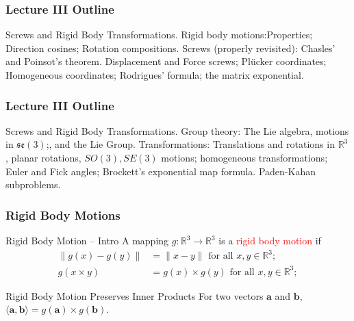 \begin{frame}
	\frametitle{Lecture III Outline}
	\begin{tcolorbox}[coltitle=yellow!50!black,colframe=magenta!25,split=.2,title=Rigid Body Motions]
		Screws and Rigid Body Transformations.
		\tcblower
		Rigid body motions:Properties; Direction cosines; Rotation compositions.
		\vspace{.2cm}
		\newline
		Screws (properly revisited): Chasles' and Poinsot's theorem.
		\vspace{.2cm}
		\newline
		Displacement and Force screws; Pl{\"u}cker coordinates; Homogeneous coordinates;
		\vspace{.2cm}
		\newline
		Rodrigues' formula; the matrix exponential.
	\end{tcolorbox}
\end{frame}

\begin{frame}
	\frametitle{Lecture III Outline}
	\begin{tcolorbox}[coltitle=yellow!50!black,colframe=magenta!25,split=.2,title=Rigid Body Motions]
		Screws and Rigid Body Transformations.
		\tcblower
		Group theory: The Lie algebra, motions in $\mathfrak{se}(3)$;, and the Lie Group.
		\vspace{.2cm}
		\newline
		Transformations: Translations and rotations in $\mathbb{R}^3$, planar rotations, $SO(3), SE(3)$ motions;  homogeneous transformations; Euler and Fick angles; Brockett's exponential map formula. Paden-Kahan subproblems.
	\end{tcolorbox}
\end{frame}

\begin{frame}
	\frametitle{Rigid Body Motions}
	\begin{block}{Rigid Body Motion -- Intro}
		A mapping $g:  \mathbb{R}^3  \rightarrow \mathbb{R}^3$ is a \textcolor{red}{rigid body motion} if 
		\begin{align}
			\|g({x}) - g({y})\| &= \|{x} - {y}\| \text{ for all }  {x}, {y} \in \mathbb{R}^3;  \\
			g({x} \times {y}) &= g(x) \times g({y})\text{ for all }  {x}, {y} \in \mathbb{R}^3; 
		\end{align}
	\end{block}	
	\begin{block}{Rigid Body Motion Preserves Inner Products}
		For two vectors $\bm{a}$ and $\bm{b}$,  $\langle \bm{a},  \bm{b}\rangle =  g(\bm{a}) \times  g(\bm{b})$.
	\end{block}
\end{frame}

